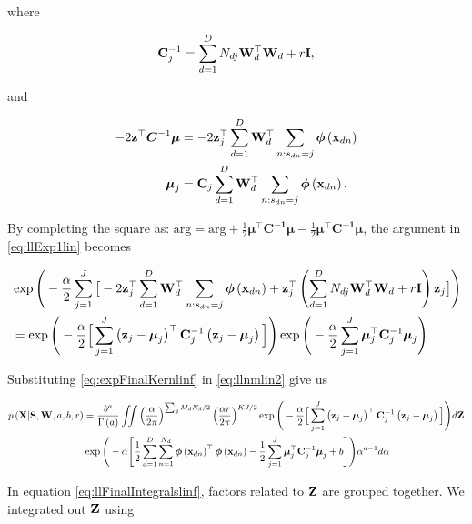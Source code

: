 	where 
	
	\begin{align}
	\mathbf{C}_j^{-1} = \sum_{d=1}^{D} N_{dj}\mathbf{W}_d^\top \mathbf{W}_d + r\mathbf{I},
	\end{align}
	
	and
	
	\begin{align}
	-2\mathbf{z}^\top \boldsymbol{C}^{-1}\boldsymbol{\mu} &=  -2 \mathbf{z}_j ^\top  \sum_{d=1}^{D}\mathbf{W}_d^\top \sum_{n:s_{dn}=j}\boldsymbol{\phi}\left(\mathbf{x}_{dn}\right) \notag \\
	\boldsymbol{\mu}_j &= \mathbf{C}_j  \sum_{d=1}^{D}\mathbf{W}_d^\top \sum_{n:s_{dn}=j}\boldsymbol{\phi}\left(\mathbf{x}_{dn}\right) .
	\end{align}
	
	By completing the square as: $\textrm{arg} = \textrm{arg} + \frac{1}{2}\boldsymbol{\mu}^\top\boldsymbol{C^{-1}}\boldsymbol{\mu} -\frac{1}{2}\boldsymbol{\mu}^\top\boldsymbol{C^{-1}}\boldsymbol{\mu}$, the argument in \eqref{eq:llExp1lin} becomes
	
	\begin{align}
	&\exp\Bigg(-\frac{\alpha}{2}\sum_{j=1}^J \big[ -2 \mathbf{z}_j ^\top  \sum_{d=1}^{D}\mathbf{W}_d^\top \sum_{n:s_{dn}=j}\boldsymbol{\phi}\left(\mathbf{x}_{dn}\right)+\mathbf{z}_j^\top  \left(\sum_{d=1}^{D} N_{dj}\mathbf{W}_d^\top \mathbf{W}_d + r\mathbf{I}\right) \mathbf{z}_j \big]\Bigg) \notag\\ &= \exp\Bigg(-\frac{\alpha}{2}\Big[\sum_{j=1}^{J} \left(\mathbf{z}_j-\boldsymbol{\mu}_j\right)^\top\mathbf{C}_j^{-1}\left(\mathbf{z}_j-\boldsymbol{\mu}_j\right)\Big]\Bigg)
	\exp\Bigg(-\frac{\alpha}{2}\sum_{j=1}^{J}\boldsymbol{\mu}_j^\top\mathbf{C}_j^{-1}\boldsymbol{\mu}_j\Bigg) \label{eq:expFinalKernlinf}
	\end{align}
	
	
	Substituting \eqref{eq:expFinalKernlinf} in \eqref{eq:llnmlin2} give us
	
	\begin{align}
	p\left(\mathbf{X}|\mathbf{S},\mathbf{W},a,b,r\right)&=\frac{b^a}{\Gamma\left(a\right)}\iint \left(\frac{\alpha}{2\pi}\right)^{\sum_d M_d N_d /2}\left(\frac{\alpha r}{2\pi}\right)^{KJ/2}\exp\Bigg(-\frac{\alpha}{2}\Big[\sum_{j=1}^{J} \left(\mathbf{z}_j-\boldsymbol{\mu}_j\right)^\top\mathbf{C}_j^{-1}\left(\mathbf{z}_j-\boldsymbol{\mu}_j\right)\Big]\Bigg)d\boldsymbol{\mathrm{Z}} \notag\\
	&\exp\Bigg(-\alpha\Bigg[\frac{1}{2} \sum_{d=1}^{D}\sum_{n=1}^{N_d}\boldsymbol{\phi}\left(\mathbf{x}_{dn}\right)^\top \boldsymbol{\phi}\left(\mathbf{x}_{dn}\right)  -\frac{1}{2}\sum_{j=1}^{J}\boldsymbol{\mu}_j^\top\mathbf{C}_j^{-1}\boldsymbol{\mu}_j +b \Bigg]\Bigg)\alpha^{a-1}d\alpha \label{eq:llFinalIntegralslinf}
	\end{align}
	
	In equation \eqref{eq:llFinalIntegralslinf}, factors related to $\boldsymbol{\mathrm{Z}}$ are grouped together. We integrated out $\boldsymbol{\mathrm{Z}}$ using
	

